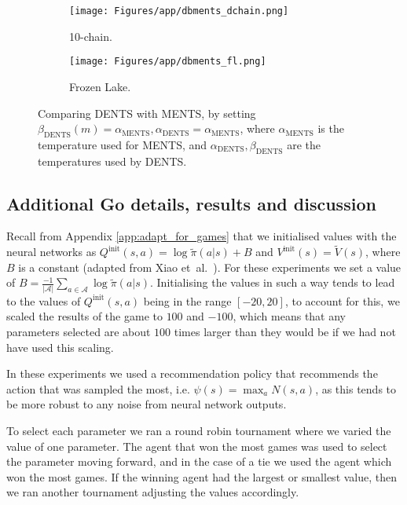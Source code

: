 \documentclass{article}
\newcommand{\etal}{et~al.\ }
\theoremstyle{plain}
\begin{document}
\begin{appendices}
        
        \begin{figure*}
            \centering
            \begin{subfigure}[b]{0.49\textwidth}
                \centering
                \texttt{[image: Figures/app/dbments\_dchain.png]}
                \caption{10-chain.}
            \end{subfigure}
            \begin{subfigure}[b]{0.49\textwidth}
                \centering
                \texttt{[image: Figures/app/dbments\_fl.png]}
                \caption{Frozen Lake.}
            \end{subfigure}
            \caption{Comparing DENTS with MENTS, by setting $\beta_{\text{DENTS}}(m)=\alpha_{\text{MENTS}}, \alpha_{\text{DENTS}}=\alpha_{\text{MENTS}}$, where $\alpha_{\text{MENTS}}$ is the temperature used for MENTS, and $\alpha_{\text{DENTS}},\beta_{\text{DENTS}}$ are the temperatures used by DENTS. }
            \label{fig:dbments}
        \end{figure*}








    \subsection{Additional Go details, results and discussion} \label{app:go_results}
    		Recall from Appendix \ref{app:adapt_for_games} that we initialised values with the neural networks as $Q^{\text{init}}(s,a)=\log \tilde{\pi}(a|s)+B$ and $V^{\text{init}}(s)=\tilde{V}(s)$, where $B$ is a constant (adapted from Xiao \etal \cite{xiao2019maximum}). For these experiments we set a value of $B=\frac{-1}{|\mathcal{A}|}\sum_{a\in\mathcal{A}} \log\tilde{\pi}(a|s)$. Initialising the values in such a way tends to lead to the values of $Q^{\text{init}}(s,a)$ being in the range $[-20,20]$, to account for this, we scaled the results of the game to $100$ and $-100$, which means that any parameters selected are about $100$ times larger than they would be if we had not have used this scaling.
    		
    		In these experiments we used a recommendation policy that recommends the action that was sampled the most, i.e. $\psi(s)=\max_a N(s,a)$, as this tends to be more robust to any noise from neural network outputs.
    		
    		To select each parameter we ran a round robin tournament where we varied the value of one parameter. The agent that won the most games was used to select the parameter moving forward, and in the case of a tie we used the agent which won the most games. If the winning agent had the largest or smallest value, then we ran another tournament adjusting the values accordingly.
    		

\end{appendices}
\end{document}
